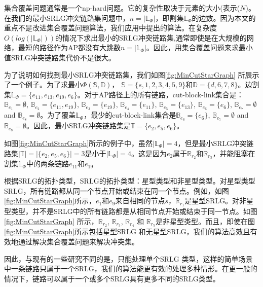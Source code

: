 集合覆盖问题通常是一个np-hard问题。它的复杂性取决于元素的大小(表示($N$)。在我们的最小SRLG冲突链路集问题中，$n=|\mathbb{L}_{\Phi}|$，即割集$\mathbb{L}_{\Phi}$的边数。因为本文的重点不是改进集合覆盖问题算法，我们应用\cite{chvatal1979greedy}中提出的算法。在复杂度$O(log(|\mathbb{L}_{\Phi}|))$的情况下求出最小的SRLG冲突链路集,通常即使是在大规模的网络，最短的路径作为AP都没有大跳数$n=|\mathbb{L}_{\Phi}|$。因此，用集合覆盖问题来求最小值SRLG冲突链路集代价不是很大。

为了说明如何找到最小SRLG冲突链路集，我们如图\ref{fig:MinCutStarGraph} 所展示了一个例子。为了求最小$\Phi(\mathbb{S},\mathbb{D})$， $\mathbb{S}=\{s, 1, 2, 3, 4, 5, 9\}$和$\mathbb{D}=\{d, 6, 7, 8\}$。边割集$\mathbb{L}_{\Phi}=\{e_{11},e_{13},e_{19},e_{6}\}$。对于AP路径上的所有链路，cut-block-link集合是：$\mathbb{B}_{e_1}=\emptyset$, $\mathbb{B}_{e_2}=\{e_{11},e_{19}\}$, $\mathbb{B}_{e_3}=\{e_{19}\}$, $\mathbb{B}_{e_4}=\{e_{11}\}$, $\mathbb{B}_{e_5}=\{e_{13}\}$, $\mathbb{B}_{e_6}=\{e_6\}$, $\mathbb{B}_{e_7}=\emptyset$ and $\mathbb{B}_{e_8}=\emptyset$。为了覆盖$\mathbb{L}_{\Phi}$，最少的cut-block-link集合是$\mathbb{B}_{e_6}=\{e_6\}$, $\mathbb{B}_{e_7}=\emptyset$ and $\mathbb{B}_{e_8}=\emptyset$。因此，最小SRLG冲突链路集是$\mathbb{T}=\{e_2, e_5, e_6 \}$。

如图\ref{fig:MinCutStarGraph}所示的例子中，虽然$|\mathbb{L}_{\Phi}|=4$，但是最小SRLG冲突链路集$|\mathbb{T}|=|\{e_2, e_5, e_6 \}|=3$是小于$|\mathbb{L}_{\Phi}|=4$。这是因为$e_2$属于$\mathbb{R}_{r_2}$和$\mathbb{R}_{r_3}$，并能阻塞在割集$\mathbb{L}_{\Phi}$中的两条链路$e_{11}$和$e_{19}$


根据SRLG的拓扑类型\cite{datta2008graph}，SRLG的拓扑类型：星型类型和非星型类型。对星型类型SRLG，所有链路都从同一个节点开始或结束在同一个节点。例如，如图\ref{fig:MinCutStarGraph}所示，$e_1$和$e_9$来自相同的节点$s$，$\mathbb{R}_{r_1}$是星型SRLG。对非星型类型，并不是SRLG中的所有链路都是从相同节点开始或结束于同一节点。如图\ref{fig:MinCutStarGraph} 所示，$\mathbb{R}_{r_2}$, $\mathbb{R}_{r_3}$, $\mathbb{R}_{r_4}$ 和 $\mathbb{R}_{r_5}$是非星型类型。而且，即使在图\ref{fig:MinCutStarGraph}所示包括星型SRLG 和无星型SRLG，我们的算法高效且有效地通过解决集合覆盖问题来解决冲突集。


因此，与现有的一些研究不同的是，\cite{datta2008graph}只能处理单个SRLG 类型，这样的简单场景中一条链路只属于一个SRLG，我们的算法能更有效的处理多种情形。在更一般的情况下，链路可以属于一个或多个SRLG具有更多不同的SRLG类型。

